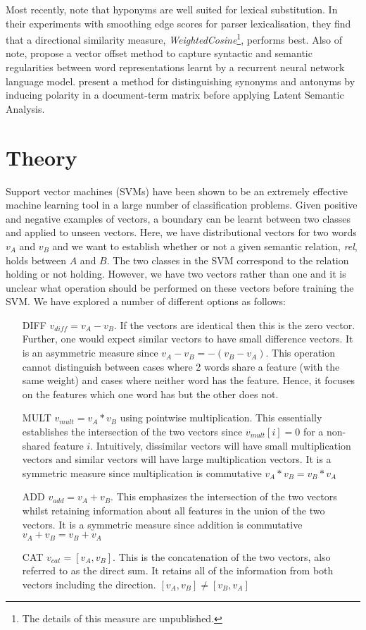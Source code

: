 \documentclass[11pt]{article}
\begin{document}
Most recently,  note that hyponyms are well suited for lexical substitution.  In their experiments with smoothing edge scores for parser lexicalisation, they find that a directional similarity measure,  \emph{WeightedCosine}\footnote{The details of this measure are unpublished.}, performs best. Also of note,  propose a vector offset method to capture syntactic and semantic regularities between word representations learnt by a recurrent neural network language model.   present a method for distinguishing synonyms and antonyms by inducing polarity in a document-term matrix before applying Latent Semantic Analysis.

\section{Theory}
\label{sect:theory}
Support vector machines (SVMs) have been shown to be an extremely effective machine learning tool in a large number of classification problems.  Given positive and negative examples of vectors, a boundary can be learnt between two classes and applied to unseen vectors.  Here, we have distributional vectors for two words $v_A$ and $v_B$ and we want to establish whether or not a given semantic relation, \emph{rel}, holds between  $A$ and $B$. The two classes in the SVM correspond to the relation holding or not holding.  However, we have two vectors rather than one and it is unclear what operation should be performed on these vectors before training the SVM.  We have explored a number of different options as follows:

\begin{itemize}
\item[DIFF]{$v_{diff} = v_A - v_B$.  If the vectors are identical then this is the zero vector.  Further, one would expect similar vectors to have small difference vectors.  It is an asymmetric measure since $v_A - v_B = -(v_B - v_A)$.  This operation cannot distinguish between cases where 2 words share a feature (with the same weight) and cases where neither word has the feature.  Hence, it focuses on the features which one word has but the other does not.}
\item[MULT]{$v_{mult} = v_A * v_B$ using pointwise multiplication.  This essentially establishes the intersection of the two vectors since $v_{mult}[i] = 0$ for a non-shared feature $i$.   Intuitively,  dissimilar vectors will have small multiplication vectors and similar vectors will have large multiplication vectors.  It is a symmetric measure since multiplication is commutative $v_A * v_B = v_B * v_A$ }
\item[ADD]{$v_{add} = v_A + v_B$.  This emphasizes the intersection of the two vectors whilst retaining information about all features in the union of the two vectors.  It is a symmetric measure since addition is commutative $v_A + v_B = v_B + v_A$}
\item[CAT]{$v_{cat} = [v_A,v_B]$.  This is the concatenation of the two vectors, also referred to as the direct sum.  It retains all of the information from both vectors including the direction.    $[v_A,v_B] \neq [v_B,v_A]$}
\end{itemize}
\end{document}
